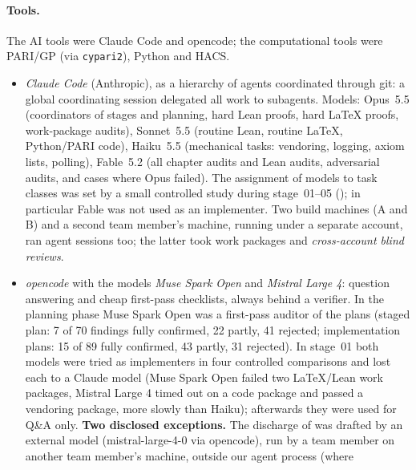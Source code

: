 \paragraph{Tools.} The AI tools were Claude Code and opencode; the computational tools were PARI/GP (via \texttt{cypari2}), Python and HACS.
\begin{itemize}
\item \emph{Claude Code} (Anthropic), as a hierarchy of agents coordinated through git: a global coordinating session
  delegated all work to subagents. Models: Opus~5.5 (coordinators of stages and planning, hard Lean proofs, hard \LaTeX{} proofs,
  work-package audits), Sonnet~5.5 (routine Lean, routine \LaTeX, Python/PARI code), Haiku~5.5 (mechanical tasks: vendoring,
  logging, axiom lists, polling), Fable~5.2 (all chapter audits and Lean audits, adversarial audits, and cases where Opus failed).
  The assignment of models to task classes was set by a small controlled study during stage~01--05
  (); in particular Fable was not used as an implementer. Two build machines (A and B) and a second
  team member's machine, running under a separate account, ran agent sessions too; the latter took work packages and
  \emph{cross-account blind reviews}.
\item \emph{opencode} with the models \emph{Muse Spark Open} and \emph{Mistral Large 4}: question answering and cheap first-pass
  checklists, always behind a verifier. In the planning phase Muse Spark Open was a first-pass auditor of the plans (staged plan: 7 of 70 findings fully confirmed, 22 partly, 41 rejected;
  implementation plans: 15 of 89 fully confirmed, 43 partly, 31 rejected). In stage~01 both models were tried as implementers in four
  controlled comparisons and lost each to a Claude model (Muse Spark Open failed two \LaTeX/Lean work packages, Mistral Large 4 timed out
  on a code package and passed a vendoring package, more slowly than Haiku); afterwards they were used for Q\&A only.
  \textbf{Two disclosed exceptions.} The discharge of  was drafted by an external model
  (mistral-large-4-0 via opencode), run by a team member on another team member's machine, outside our agent process (where

\end{itemize}
